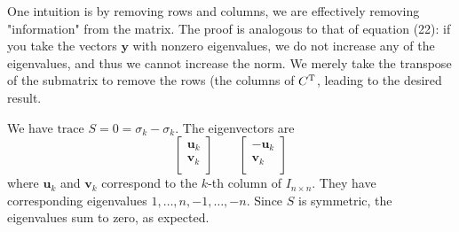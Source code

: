 \documentclass[a4paper]{article}
\begin{document}
\vspace{12pt}

\newpage

One intuition is by removing rows and columns, we are effectively removing "information" from the matrix. The proof is analogous to that of equation (22): if you take the vectors \(\bm{y}\) with nonzero eigenvalues, we do not increase any of the eigenvalues, and thus we cannot increase the norm. We merely take the transpose of the submatrix to remove the rows (the columns of \(C^{\textsc{T}}\), leading to the desired result.

\vspace{12pt}



We have \(\text{trace }S = 0 = \sigma_{k} - \sigma_{k}\). The eigenvectors are
\[
	\begin{bmatrix}
		\bm{u}_{k} \\
		\bm{v}_{k} \\
	\end{bmatrix}
	\qquad
	\begin{bmatrix}
		-\bm{u}_{k} \\
		\bm{v}_{k} \\
	\end{bmatrix}
\]
where \(\bm{u}_{k}\) and \(\bm{v}_{k}\) correspond to the \(k\)-th column of \(I_{n \times n}\). They have corresponding eigenvalues \(1, \ldots, n, -1, \ldots, -n\). Since \(S\) is symmetric, the eigenvalues sum to zero, as expected.
\end{document}
